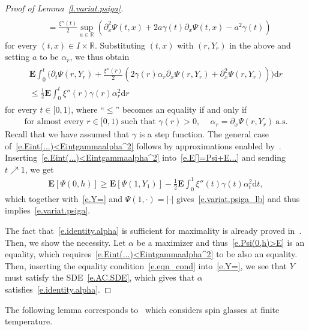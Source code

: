 \documentclass[11pt]{amsart}
\theoremstyle{remark}
\theoremstyle{definition}
\numberwithin{equation}{section}
\numberwithin{proposition}{section}
\numberwithin{figure}{section}
\numberwithin{table}{section}
\newcommand{\R}{\mathbb{R}}
\newcommand{\EE}{\mathbf{E}}
\renewcommand{\leq}{\leqslant}
\renewcommand{\geq}{\geqslant}
\newcommand{\Ll}{\left}
\newcommand{\Rr}{\right}
\renewcommand{\d}{\mathrm{d}}
\newcommand{\1}{\mathbf{1}}
\newcommand{\ga}{\gamma}
\begin{document}
\begin{proof}[Proof of Lemma~\ref{l.variat.psiga}]
\begin{align*}
    \\
    & = \frac{\xi''(t)}{2} \sup_{a\in\R}\Ll ( \partial_{x}^2 \Psi(t,x) +2a \ga(t)\partial_x \Psi(t,x) - a^2 \gamma(t)\Rr)
\end{align*}
for every $(t,x) \in I \times \R$.
Substituting $(t,x)$ with $(r,Y_r)$ in the above and setting $a$ to be $\alpha_r$, we thus obtain
\begin{align}\label{e.Eint(...)<Eintgammaalpha^2}
\begin{split}
    \EE\int_0^t\Big(\partial_t\Psi(r,Y_r)
    +\frac{\xi''(r)}{2}\Ll(2\gamma(r)\alpha_r\partial_x\Psi(r,Y_r)+\partial^2_x\Psi(r,Y_r)\Rr)\Big)\d r 
    \\
    \leq \frac{1}{2} \EE \int_0^t \xi''(r)\gamma(r)\alpha^2_r\d r
\end{split}
\end{align}
for every $t\in[0,1)$, where ``$\leq$'' becomes an equality if and only if
\begin{align}\label{e.eqn_cond}
    \text{for almost every $r\in[0,1)$ such that $\gamma(r)>0$, }\quad \alpha_r = \partial_x \Psi(r,Y_r) \ \text{a.s.}
\end{align}
Recall that we have assumed that $\gamma$ is a step function. The general case of~\eqref{e.Eint(...)<Eintgammaalpha^2} follows by approximations enabled by~\cite[Proposition~2~(iii)]{chen2018energy}.
Inserting~\eqref{e.Eint(...)<Eintgammaalpha^2} into~\eqref{e.E[]=Psi+E...} and sending $t\nearrow1$, we get
\begin{align}\label{e.Psi(0,h)>E}
    \EE\Ll[\Psi(0,h)\Rr] \geq \EE [\Psi(1,Y_1)] -\frac{1}{2} \EE \int_0^1 \xi''(t)\gamma(t)\alpha^2_t\d t,
\end{align}
which together with~\eqref{e.Y=} and $\Psi(1,\cdot)=|\cdot|$ gives~\eqref{e.variat.psiga_lb} and thus implies~\eqref{e.variat.psiga}. 


The fact that~\eqref{e.identity.alpha} is sufficient for maximality is already proved in~\cite[Theorem~5]{chen2018energy}.
Then, we show the necessity. Let $\alpha$ be a maximizer and thus~\eqref{e.Psi(0,h)>E} is an equality, which requires~\eqref{e.Eint(...)<Eintgammaalpha^2} to be also an equality. Then, inserting the equality condition~\eqref{e.eqn_cond} into~\eqref{e.Y=}, we see that $Y$ must satisfy the SDE~\eqref{e.AC.SDE}, which gives that $\alpha$ satisfies~\eqref{e.identity.alpha}.
\end{proof}




The following lemma corresponds to~\cite[Lemma~2.2]{mourrat2025uninverting} which considers spin glasses at finite temperature. 
\end{document}
